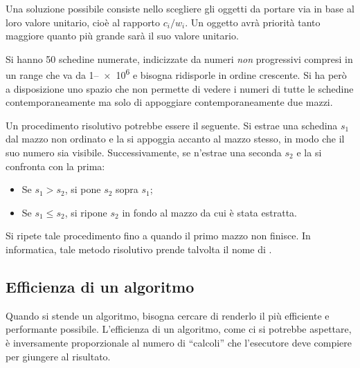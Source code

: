 Una soluzione possibile consiste nello scegliere gli oggetti da portare via in base al loro valore unitario, cioè al rapporto $c_i/w_i$. 
Un oggetto avrà priorità tanto maggiore quanto più grande sarà il suo valore unitario.


Si hanno \num{50} schedine numerate, indicizzate da numeri \emph{non} progressivi compresi in un range che va da \numrange{1}{e6} e bisogna ridisporle in ordine crescente.
Si ha però a disposizione uno spazio che non permette di vedere i numeri di tutte le schedine contemporaneamente ma solo di appoggiare contemporaneamente due mazzi.

Un procedimento risolutivo potrebbe essere il seguente.
Si estrae una schedina $s_1$ dal mazzo non ordinato e la si appoggia accanto al mazzo stesso, in modo che il suo numero sia visibile.
Successivamente, se n'estrae una seconda $s_2$ e la si confronta con la prima:
\begin{itemize}
	\item
Se $s_1 > s_2$, si pone $s_2$ sopra $s_1$;
	\item
Se $s_1 \le s_2$, si ripone $s_2$ in fondo al mazzo da cui è stata estratta.
\end{itemize}
Si ripete tale procedimento fino a quando il primo mazzo non finisce. In informatica, tale metodo risolutivo prende talvolta il nome di .



		\subsection{Efficienza di un algoritmo}
		\label{subsec:eff}
Quando si stende un algoritmo, bisogna cercare di renderlo il più efficiente e performante possibile.
L'efficienza di un algoritmo, come ci si potrebbe aspettare, è inversamente proporzionale al numero di ``calcoli'' che l'esecutore deve compiere per giungere al risultato. 

